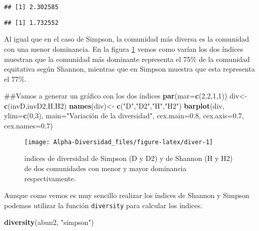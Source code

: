 \documentclass[]{book}
\newenvironment{Shaded}{\begin{snugshade}}{\end{snugshade}}
\newcommand{\KeywordTok}[1]{\textcolor[rgb]{0.13,0.29,0.53}{\textbf{{#1}}}}
\newcommand{\DataTypeTok}[1]{\textcolor[rgb]{0.13,0.29,0.53}{{#1}}}
\newcommand{\DecValTok}[1]{\textcolor[rgb]{0.00,0.00,0.81}{{#1}}}
\newcommand{\FloatTok}[1]{\textcolor[rgb]{0.00,0.00,0.81}{{#1}}}
\newcommand{\StringTok}[1]{\textcolor[rgb]{0.31,0.60,0.02}{{#1}}}
\newcommand{\NormalTok}[1]{{#1}}
\begin{document}
\begin{verbatim}
## [1] 2.302585
\end{verbatim}

\begin{verbatim}
## [1] 1.732552
\end{verbatim}

Al igual que en el caso de Simpson, la comunidad más diversa es la
comunidad con una menor dominancia. En la figura \ref{fig:diver} vemos
como varían los dos índices muestran que la comunidad más dominante
representa el 75\% de la comunidad equitativa según Shannon, mientras
que en Simpson muestra que esta representa el 77\%.

\begin{Shaded}
\begin{Highlighting}[]
\NormalTok{##Vamos a generar un gráfico con los dos índices}
\KeywordTok{par}\NormalTok{(}\DataTypeTok{mar=}\KeywordTok{c}\NormalTok{(}\DecValTok{2}\NormalTok{,}\DecValTok{2}\NormalTok{,}\DecValTok{1}\NormalTok{,}\DecValTok{1}\NormalTok{))}
\NormalTok{div<-}\StringTok{ }\KeywordTok{c}\NormalTok{(invD,invD2,H,H2)}
\KeywordTok{names}\NormalTok{(div)<-}\StringTok{ }\KeywordTok{c}\NormalTok{(}\StringTok{"D"}\NormalTok{,}\StringTok{"D2"}\NormalTok{,}\StringTok{"H"}\NormalTok{,}\StringTok{"H2"}\NormalTok{)}
\KeywordTok{barplot}\NormalTok{(div, }\DataTypeTok{ylim=}\KeywordTok{c}\NormalTok{(}\DecValTok{0}\NormalTok{,}\DecValTok{3}\NormalTok{), }\DataTypeTok{main=}\StringTok{"Variación de la diversidad"}\NormalTok{,}
        \DataTypeTok{cex.main=}\FloatTok{0.8}\NormalTok{, }\DataTypeTok{cex.axis=}\FloatTok{0.7}\NormalTok{, }\DataTypeTok{cex.names=}\FloatTok{0.7}\NormalTok{)}
\end{Highlighting}
\end{Shaded}

\begin{figure}

{\centering \texttt{[image: Alpha-Diversidad\_files/figure-latex/diver-1]} 

}

\caption{índices de diversidad de Simpson (D y D2)  y de Shannon (H y H2) de dos comunidades con menor y mayor dominancia respectivamente.}\label{fig:diver}
\end{figure}

Aunque como vemos es muy sencillo realizar los índices de Shannon y
Simpson podemos utilizar la función \texttt{diversity} para calcular los
índices.

\begin{Shaded}
\begin{Highlighting}[]
\KeywordTok{diversity}\NormalTok{(abun2, }\StringTok{"simpson"}\NormalTok{)}
\end{Highlighting}
\end{Shaded}
\end{document}
